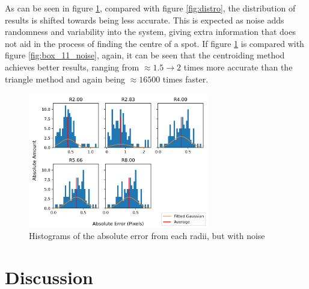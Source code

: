 \documentclass[aps,pra,a4paper,nofootinbib,onecolumn,tightenlines,longbibliography,12pt,amsfonts,amssymb,amsmath,floatfix]{revtex4-2} %
\begin{document}
  As can be seen in figure \ref{fig:distro_noise}, compared with figure \ref{fig:distro}, the distribution
  of results is shifted towards being less accurate. This is expected as noise adds randomness and 
  variability into the system, giving extra information that does not aid in the process of finding the 
  centre of a spot. If figure \ref{fig:distro_noise} is compared with figure \ref{fig:box_11_noise}, again, 
  it can be seen that the centroiding method achieves better results, ranging from $\approx 1.5\rightarrow 2$
  times more accurate than the triangle method and again being $\approx 16500$ times faster.

  \begin{figure}[H]
    \begin{center}
      \includegraphics[width=0.7\textwidth]{project_pics/distro_noise.png}
    \end{center}
    \caption{Histograms of the absolute error from each radii, but with noise}
    \label{fig:distro_noise}
  \end{figure}


\section{Discussion} %
\label{sec:Discussion}
\end{document}
